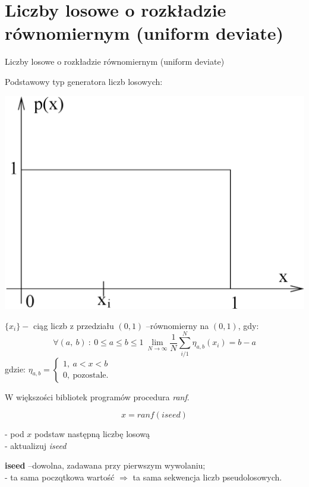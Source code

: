 \section{Liczby losowe o rozkładzie równomiernym (uniform deviate)}
	\begin{frame}{Liczby losowe o rozkładzie równomiernym (uniform deviate)}
	

	Podstawowy typ generatora liczb losowych:
	\begin{center}
	\includegraphics[scale=0.15]{img/14/14_2_img}
	\end{center}
    \end{frame}
    
    \begin{frame}
    \begin{exampleblock}{}
	$\{x_{i}\}-$ ciąg liczb z przedziału $(0,1)$ --równomierny na $(0,1)$, gdy:
	$$
	\forall(a,\ b)\ :\ 0\leq a\leq b\leq 1\ \lim_{N\rightarrow\infty}\frac{1}{N}\sum_{i/1}^{N}\eta_{a,b}		(x_{i})=b-a
	$$
	gdzie: $\eta_{a,b}=\left\{\begin{array}{l}
	1,\ a<x<b\\
	0,\ \mathrm{p}\mathrm{o}\mathrm{z}\mathrm{o}\mathrm{s}\mathrm{t}\mathrm{a}\mathrm{l}\mathrm{e}.
	\end{array}\right.$
	\end{exampleblock}
	W większości bibliotek programów procedura \textit{ranf}.
    	
            \[
            	x = ranf(iseed)
            \]
 
	- pod $x$ podstaw następną liczbę losową \\
    - aktualizuj \textit{iseed}

	\textbf{iseed} --dowolna, zadawana przy pierwszym wywolaniu; \\
	- ta sama poczqtkowa wartość $\Rightarrow$ ta sama sekwencja liczb pseudolosowych.
	\end{frame}